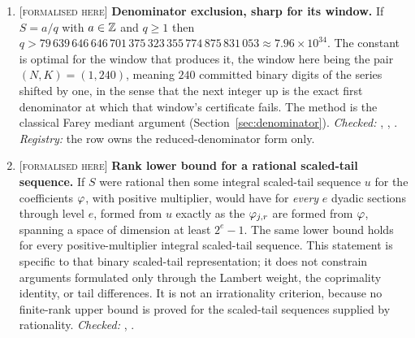 \documentclass[11pt]{article}
\newcommand{\Stot}{S}
\newcommand{\stag}[1]{{\normalfont\footnotesize\textsc{[#1]}}}
\begin{document}
{\begin{enumerate}[label=\textbf{R\arabic*.},ref=R\arabic*,leftmargin=2.4em,
  itemsep=0.2em,topsep=0.25em]
\item\label{res:denominator} \stag{formalised here}
\textbf{Denominator exclusion, sharp for its window.}  If $\Stot=a/q$ with
$a\in\mathbb{Z}$ and $q\ge1$ then
$q>79\,639\,646\,646\,701\,375\,323\,355\,774\,875\,831\,053\approx7.96\times10^{34}$.
The constant is optimal for the window that produces it, the window here being
the pair $(N,K)=(1,240)$, meaning $240$ committed binary digits of the series
shifted by one, in the sense that the next integer up is the exact first
denominator at which that window's certificate fails.  The method is the
classical Farey mediant argument (Section~\ref{sec:denominator}).
{\footnotesize\emph{Checked:}
,
,
.
\emph{Registry:} the row owns the reduced-denominator form only.}

\item\label{res:carryrank} \stag{formalised here}
\textbf{Rank lower bound for a rational scaled-tail sequence.}  If $\Stot$
were rational then some integral scaled-tail sequence $u$ for the coefficients
$\varphi$, with positive multiplier, would have for \emph{every} $e$ dyadic
sections through level $e$, formed from $u$ exactly as the $\varphi_{j,r}$ are
formed from $\varphi$, spanning a space of dimension at least $2^e-1$.  The
same lower bound holds for every positive-multiplier integral scaled-tail
sequence.  This statement is specific to that
binary scaled-tail representation; it does not constrain arguments formulated
only through the Lambert weight, the coprimality identity, or tail differences.
It is not an irrationality criterion, because no finite-rank upper bound is
proved for the scaled-tail sequences supplied by rationality.
{\footnotesize\emph{Checked:}
,
.}


\end{enumerate}}
\end{document}
